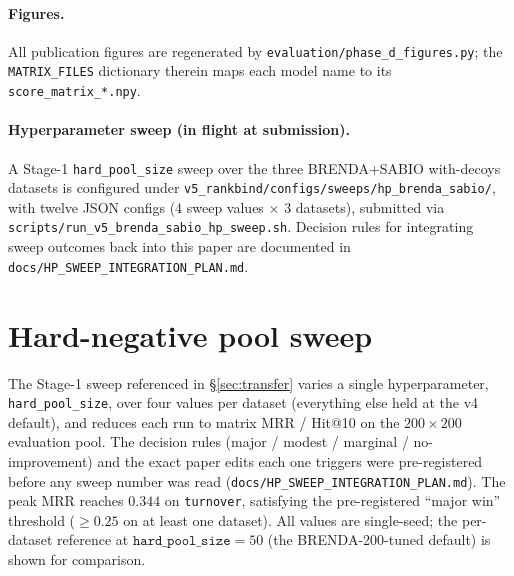 \documentclass[11pt,a4paper]{article}
\begin{document}
\paragraph{Figures.}
All publication figures are regenerated by
\texttt{evaluation/phase\_d\_figures.py}; the \texttt{MATRIX\_FILES}
dictionary therein maps each model name to its
\texttt{score\_matrix\_*.npy}.

\paragraph{Hyperparameter sweep (in flight at submission).}
A Stage-1 \texttt{hard\_pool\_size} sweep over the three
BRENDA+SABIO with-decoys datasets is configured under
\texttt{v5\_rankbind/configs/sweeps/hp\_brenda\_sabio/}, with twelve
JSON configs ($4$ sweep values $\times$ $3$ datasets), submitted via
\texttt{scripts/run\_v5\_brenda\_sabio\_hp\_sweep.sh}. Decision rules
for integrating sweep outcomes back into this paper are documented in
\texttt{docs/HP\_SWEEP\_INTEGRATION\_PLAN.md}.

\section{Hard-negative pool sweep}
\label{sec:hpsweep}

The Stage-1 sweep referenced in \S\ref{sec:transfer} varies a single
hyperparameter, \texttt{hard\_pool\_size}, over four values per dataset
(everything else held at the v4 default), and reduces each run to matrix
MRR / Hit@10 on the $200 \times 200$ evaluation pool. The decision rules
(major / modest / marginal / no-improvement) and the exact paper edits
each one triggers were pre-registered before any sweep number was read
(\texttt{docs/HP\_SWEEP\_INTEGRATION\_PLAN.md}). The peak MRR reaches
$0.344$ on \texttt{turnover}, satisfying the pre-registered
``major win'' threshold ($\ge 0.25$ on at least one dataset). All values
are single-seed; the per-dataset reference at $\texttt{hard\_pool\_size}=50$
(the BRENDA-200-tuned default) is shown for comparison.
\end{document}
